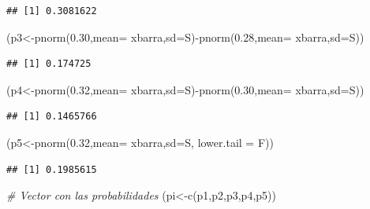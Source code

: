 \documentclass{staprojteamusb}
\newenvironment{Shaded}{\begin{snugshade}}{\end{snugshade}}
\newcommand{\AttributeTok}[1]{\textcolor[rgb]{0.77,0.63,0.00}{#1}}
\newcommand{\CommentTok}[1]{\textcolor[rgb]{0.56,0.35,0.01}{\textit{#1}}}
\newcommand{\FloatTok}[1]{\textcolor[rgb]{0.00,0.00,0.81}{#1}}
\newcommand{\FunctionTok}[1]{\textcolor[rgb]{0.00,0.00,0.00}{#1}}
\newcommand{\NormalTok}[1]{#1}
\newcommand{\OtherTok}[1]{\textcolor[rgb]{0.56,0.35,0.01}{#1}}
\newcommand{\SpecialCharTok}[1]{\textcolor[rgb]{0.00,0.00,0.00}{#1}}
\begin{document}
\begin{verbatim}
## [1] 0.3081622
\end{verbatim}

\begin{Shaded}
\begin{Highlighting}[]
\NormalTok{(p3}\OtherTok{\textless{}{-}}\FunctionTok{pnorm}\NormalTok{(}\FloatTok{0.30}\NormalTok{,}\AttributeTok{mean=}\NormalTok{ xbarra,}\AttributeTok{sd=}\NormalTok{S)}\SpecialCharTok{{-}}\FunctionTok{pnorm}\NormalTok{(}\FloatTok{0.28}\NormalTok{,}\AttributeTok{mean=}\NormalTok{ xbarra,}\AttributeTok{sd=}\NormalTok{S))}
\end{Highlighting}
\end{Shaded}

\begin{verbatim}
## [1] 0.174725
\end{verbatim}

\begin{Shaded}
\begin{Highlighting}[]
\NormalTok{(p4}\OtherTok{\textless{}{-}}\FunctionTok{pnorm}\NormalTok{(}\FloatTok{0.32}\NormalTok{,}\AttributeTok{mean=}\NormalTok{ xbarra,}\AttributeTok{sd=}\NormalTok{S)}\SpecialCharTok{{-}}\FunctionTok{pnorm}\NormalTok{(}\FloatTok{0.30}\NormalTok{,}\AttributeTok{mean=}\NormalTok{ xbarra,}\AttributeTok{sd=}\NormalTok{S))}
\end{Highlighting}
\end{Shaded}

\begin{verbatim}
## [1] 0.1465766
\end{verbatim}

\begin{Shaded}
\begin{Highlighting}[]
\NormalTok{(p5}\OtherTok{\textless{}{-}}\FunctionTok{pnorm}\NormalTok{(}\FloatTok{0.32}\NormalTok{,}\AttributeTok{mean=}\NormalTok{ xbarra,}\AttributeTok{sd=}\NormalTok{S, }\AttributeTok{lower.tail =}\NormalTok{ F))}
\end{Highlighting}
\end{Shaded}

\begin{verbatim}
## [1] 0.1985615
\end{verbatim}

\begin{Shaded}
\begin{Highlighting}[]
\CommentTok{\# Vector con las probabilidades}
\NormalTok{(pi}\OtherTok{\textless{}{-}}\FunctionTok{c}\NormalTok{(p1,p2,p3,p4,p5))}
\end{Highlighting}
\end{Shaded}
\end{document}

